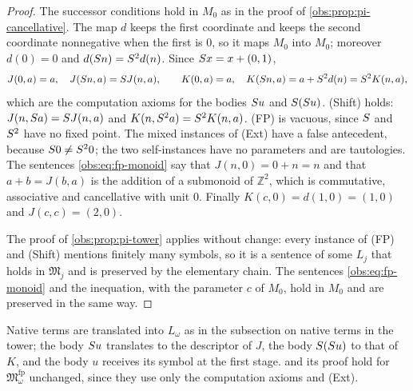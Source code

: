 \begin{proof}
The successor conditions hold in $M_0$ as in the proof of
\cref{obs:prop:pi-cancellative}. The map $d$ keeps the first coordinate and
keeps the second coordinate nonnegative when the first is $0$, so it maps $M_0$
into $M_0$; moreover $d(0)=0$ and $d(S n)=S^{2}d(n)$. Since
$S x=x+(0,1)$,
\[
J(0,a)=a,\quad J(S n,a)=S J(n,a),\qquad
K(0,a)=a,\quad K(S n,a)=a+S^{2}d(n)=S^{2}K(n,a),
\]
which are the computation axioms for the bodies $S u$ and $S(S u)$.
(Shift) holds: $J(n,S a)=S J(n,a)$ and $K(n,S^{2}a)=S^{2}K(n,a)$.
(FP) is vacuous, since $S$ and $S^{2}$ have no fixed point. The mixed
instances of (Ext) have a false antecedent, because $S 0\ne S^{2}0$; the
two self-instances have no parameters and are tautologies. The sentences
\eqref{obs:eq:fp-monoid} say that $J(n,0)=0+n=n$ and that $a+b=J(b,a)$ is the
addition of a submonoid of $\mathbb{Z}^{2}$, which is commutative, associative
and cancellative with unit $0$. Finally $K(c,0)=d(1,0)=(1,0)$ and
$J(c,c)=(2,0)$.

The proof of \cref{obs:prop:pi-tower} applies without change: every instance of
(FP) and (Shift) mentions finitely many symbols, so it is a sentence of some
$L_j$ that holds in $\mathfrak{M}_j$ and is preserved by the elementary chain.
The sentences \eqref{obs:eq:fp-monoid} and the inequation, with the parameter
$c$ of $M_0$, hold in $M_0$ and are preserved in the same way.
\end{proof}

Native terms are translated into $L_\omega$ as in the subsection on native
terms in the tower; the body $S u$ translates to the descriptor of $J$, the
body $S(S u)$ to that of $K$, and the body $u$ receives its symbol at the
first stage.  and its proof hold for
$\mathfrak{M}^{\mathrm{fp}}_\omega$ unchanged, since they use only the
computation axioms and (Ext).

